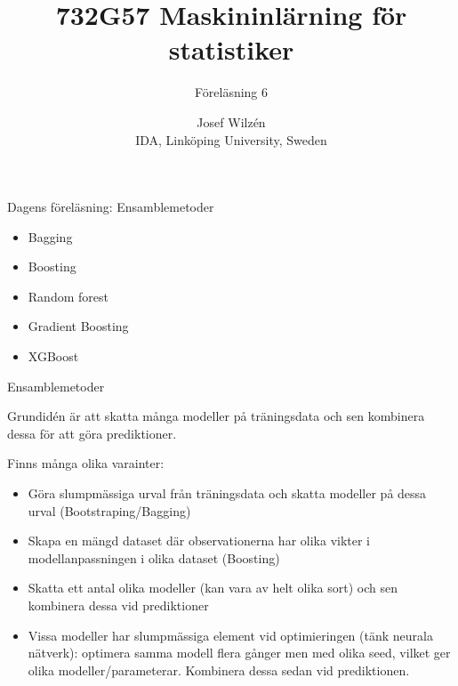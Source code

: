 \documentclass[10pt,english]{beamer}
\title{732G57 Maskininlärning för statistiker}
\subtitle{Föreläsning 6}
\date{}
\author{Josef Wilzén \\ IDA, Linköping University, Sweden}
\begin{document}
\maketitle

\begin{frame}{Dagens föreläsning: Ensamblemetoder}

    \begin{itemize}
        \item Bagging
        \item Boosting
        \item Random forest
        \item Gradient Boosting 
        \item XGBoost
    \end{itemize}
    
\end{frame}


\begin{frame}{Ensamblemetoder}
    
    Grundidén är att skatta många modeller på träningsdata och sen kombinera dessa för att göra prediktioner.
    
    Finns många olika varainter:
     \begin{itemize}
        \item Göra slumpmässiga urval från träningsdata och skatta modeller på dessa urval (Bootstraping/Bagging)
        \item Skapa en mängd dataset där observationerna har olika vikter i modellanpassningen i olika dataset (Boosting)
        \item Skatta ett antal olika modeller (kan vara av helt olika sort) och sen kombinera dessa vid prediktioner
        \item Vissa modeller har slumpmässiga element vid optimieringen (tänk neurala nätverk): optimera samma modell flera gånger men med olika seed, vilket ger olika modeller/parameterar. Kombinera dessa sedan vid prediktionen.
    \end{itemize}

\end{frame}
\end{document}
